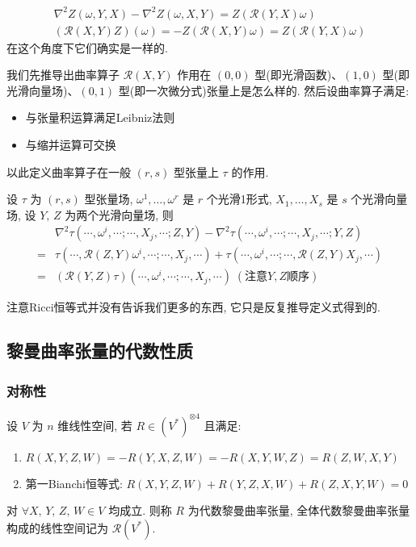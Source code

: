 \begin{gather*}
    \nabla^2Z(\omega,Y,X) - \nabla^2Z(\omega,X,Y) = Z(\mathcal{R}(Y,X)\omega) \\
    (\mathcal{R}(X,Y)Z)(\omega) = -Z(\mathcal{R}(X,Y)\omega) = Z(\mathcal{R}(Y,X)\omega)
\end{gather*}
在这个角度下它们确实是一样的.
\begin{definition}[曲率算子作用在张量场]
    我们先推导出曲率算子 $\mathcal{R}(X,Y)$ 作用在 $(0,0)$ 型(即光滑函数)、$(1,0)$ 型(即光滑向量场)、$(0,1)$ 型(即一次微分式)张量上是怎么样的. 然后设曲率算子满足:
    \begin{itemize}
        \item 与张量积运算满足Leibniz法则
        \item 与缩并运算可交换
    \end{itemize}
    以此定义曲率算子在一般 $(r,s)$ 型张量上 $\tau$ 的作用.
\end{definition}
\begin{proposition}[Ricci恒等式]
    设 $\tau$ 为 $(r,s)$ 型张量场, $\omega^1,\dots,\omega^r$ 是 $r$ 个光滑1形式, $X_1,\dots,X_s$ 是 $s$ 个光滑向量场, 设 $Y,\,Z$ 为两个光滑向量场, 则
    \begin{align*}
        & \nabla^2\tau(\cdots,\omega^i,\cdots;\cdots,X_j,\cdots;Z,Y) - \nabla^2\tau(\cdots,\omega^i,\cdots;\cdots,X_j,\cdots;Y,Z) \\
        =& \tau(\cdots,\mathcal{R}(Z,Y)\omega^i,\cdots;\cdots,X_j,\cdots) + \tau(\cdots,\omega^i,\cdots;\cdots,\mathcal{R}(Z,Y)X_j,\cdots) \\
        =&(\mathcal{R}(Y,Z)\tau)(\cdots,\omega^i,\cdots;\cdots,X_j,\cdots) \;(\text{注意}Y,Z\text{顺序})
    \end{align*}
\end{proposition}
\begin{remark}
    注意{\rm Ricci}恒等式并没有告诉我们更多的东西, 它只是反复推导定义式得到的.
\end{remark}
\subsection{黎曼曲率张量的代数性质}
\subsubsection{对称性}
    设 $V$ 为 $n$ 维线性空间, 若 $R\in(V^*)^{\otimes4}$ 且满足:
    \begin{enumerate}
        \item $R(X,Y,Z,W) = -R(Y,X,Z,W) = -R(X,Y,W,Z) = R(Z,W,X,Y)$
        \item 第一Bianchi恒等式: $R(X,Y,Z,W) + R(Y,Z,X,W) + R(Z,X,Y,W) = 0$
    \end{enumerate} 对 $\forall X,\,Y,\,Z,\,W\in V$ 均成立.
    则称 $R$ 为代数黎曼曲率张量, 全体代数黎曼曲率张量构成的线性空间记为 $\mathcal{R}(V^*)$.

